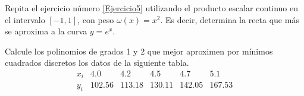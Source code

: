 \begin{ejercicio}
    Repita el ejercicio número \ref{Ejercicio5} utilizando el producto escalar continuo en el intervalo $[-1, 1]$, con peso $\omega(x) = x^2$. Es decir, determina la recta que más se aproxima a la curva $y = e^x$.
\end{ejercicio}

\begin{ejercicio}
    Calcule los polinomios de grados 1 y 2 que mejor aproximen por mínimos cuadrados discretos los datos de la siguiente tabla.
    \begin{equation*}
        \begin{array}{c|c|c|c|c|c}
            x_i & 4.0 & 4.2 & 4.5 & 4.7 & 5.1 \\ \hline
            y_i & 102.56 & 113.18 & 130.11 & 142.05 & 167.53
        \end{array}
    \end{equation*}
\end{ejercicio}

